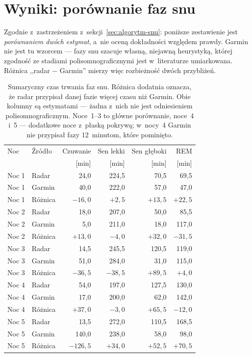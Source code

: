 \documentclass[12pt,a4paper,oneside]{report}
\begin{document}
\section{Wyniki: porównanie faz snu}
\label{sec:fazy-wyniki}

Zgodnie z~zastrzeżeniem z~sekcji~\ref{sec:algorytm-snu}: poniższe zestawienie
jest \emph{porównaniem dwóch estymat}, a~nie oceną dokładności względem prawdy.
Garmin nie jest tu wzorcem --- fazy snu szacuje własną, niejawną heurystyką,
której zgodność ze stadiami polisomnograficznymi jest w~literaturze umiarkowana.
Różnica ,,radar $-$ Garmin'' mierzy więc rozbieżność dwóch przybliżeń.

\begin{table}[H]
\centering
\caption{Sumaryczny czas trwania faz snu. Różnica dodatnia oznacza, że radar
przypisał danej fazie więcej czasu niż Garmin. Obie kolumny są estymatami ---
żadna z~nich nie jest odniesieniem polisomnograficznym. Noce~1--3 to główne
porównanie, noce~4 i~5 --- dodatkowe noce z~płaską pokrywą; w~nocy~4 Garmin nie
przypisał fazy 12~minutom, które pominięto.}
\label{tab:fazy}
\small
\begin{tabular}{@{}llrrrr@{}}
\toprule
Noc & Źródło & Czuwanie & Sen lekki & Sen głęboki & REM \\
 & & [min] & [min] & [min] & [min] \\
\midrule
Noc 1 & Radar    & 24,0 & 224,5 & 70,5 & 69,5 \\
Noc 1 & Garmin   & 40,0 & 222,0 & 57,0 & 47,0 \\
Noc 1 & Różnica  & $-16{,}0$ & $+2{,}5$ & $+13{,}5$ & $+22{,}5$ \\
\midrule
Noc 2 & Radar    & 18,0 & 207,0 & 50,0 & 85,5 \\
Noc 2 & Garmin   & 5,0  & 211,0 & 18,0 & 117,0 \\
Noc 2 & Różnica  & $+13{,}0$ & $-4{,}0$ & $+32{,}0$ & $-31{,}5$ \\
\midrule
Noc 3 & Radar   & 14,5 & 245,5 & 120,5 & 119,0 \\
Noc 3 & Garmin  & 51,0 & 284,0 & 31,0  & 115,0 \\
Noc 3 & Różnica & $-36{,}5$ & $-38{,}5$ & $+89{,}5$ & $+4{,}0$ \\
\midrule
Noc 4 & Radar   & 54,0 & 197,0 & 127,5 & 130,0 \\
Noc 4 & Garmin  & 17,0 & 200,0 & 62,0  & 142,0 \\
Noc 4 & Różnica & $+37{,}0$ & $-3{,}0$ & $+65{,}5$ & $-12{,}0$ \\
\midrule
Noc 5 & Radar   & 13,5 & 272,0 & 110,5 & 168,5 \\
Noc 5 & Garmin  & 140,0 & 238,0 & 58,0 & 98,0 \\
Noc 5 & Różnica & $-126{,}5$ & $+34{,}0$ & $+52{,}5$ & $+70{,}5$ \\
\bottomrule
\end{tabular}
\end{table}
\end{document}
